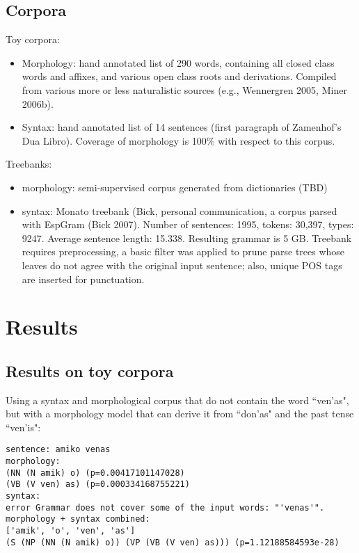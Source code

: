 \documentclass[10pt,a4paper]{article}
\begin{document}
\subsection{Corpora}

Toy corpora:

\begin{itemize}
\item Morphology: hand annotated list of 290 words, containing all closed class
      words and affixes, and various open class roots and derivations. Compiled
      from various more or less naturalistic sources (e.g., Wennergren 2005,
      Miner 2006b).
\item Syntax: hand annotated list of 14 sentences (first paragraph of
      Zamenhof's Dua Libro). Coverage of morphology is 100\% with respect to
      this corpus.
\end{itemize}

Treebanks:

\begin{itemize}
\item morphology: semi-supervised corpus generated from dictionaries (TBD)
\item syntax: Monato treebank (Bick, personal communication, a corpus parsed
      with EspGram (Bick 2007).  Number of sentences: 1995, tokens: 30,397,
      types: 9247. Average sentence length: 15.338. Resulting grammar is 5 GB.
      Treebank requires preprocessing, a basic filter was applied to prune
      parse trees whose leaves do not agree with the original input sentence;
      also, unique POS tags are inserted for punctuation.
\end{itemize}

\section{Results}
\subsection{Results on toy corpora}

Using a syntax and morphological corpus that do not contain the word ``ven'as",
but with a morphology model that can derive it from ``don'as" and the past
tense ``ven'is":

\begin{verbatim}
sentence: amiko venas
morphology:
(NN (N amik) o) (p=0.00417101147028)
(VB (V ven) as) (p=0.000334168755221)
syntax:
error Grammar does not cover some of the input words: "'venas'".
morphology + syntax combined:
['amik', 'o', 'ven', 'as']
(S (NP (NN (N amik) o)) (VP (VB (V ven) as))) (p=1.12188584593e-28)
\end{verbatim}
\end{document}

